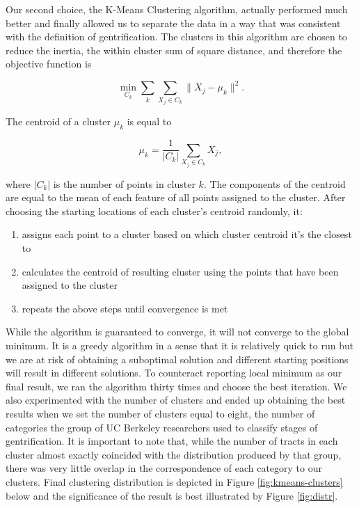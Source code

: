 \documentclass[a4paper, 12pt]{article}
\numberwithin{equation}{section}
\begin{document}
	        Our second choice, the K-Means Clustering algorithm, actually performed much better and finally allowed us to separate the data in a way that was consistent with the definition of gentrification. The clusters in this algorithm are chosen to reduce the inertia, the within cluster sum of square distance, and therefore the objective function is

            $$ \min_{C_k} \sum_{k} \sum_{X_j \in  C_k} \| X_j  - \mu_k \|^2. $$

            The centroid of a cluster $\mu_k$ is equal to

            $$ \mu_k = \frac{1}{|C_k|} \sum_{X_j \in C_k} X_j, $$

            where $|C_k|$ is the number of points in cluster $k$. The components of the centroid are equal to the mean of each feature of all points assigned to the cluster. After choosing the starting locations of each cluster's centroid randomly, it:
                
                \begin{enumerate}
                    \item assigns each point to a cluster based on which cluster centroid it's the closest to
                    \item calculates the centroid of resulting cluster using the points that have been assigned to the cluster
                    \item repeats the above steps until convergence is met
                \end{enumerate}
            
            While the algorithm is guaranteed to converge, it will not converge to the global minimum. It is a greedy algorithm in a sense that it is relatively quick to run but we are at risk of obtaining a suboptimal solution and different starting positions will result in different solutions. To counteract reporting local minimum as our final result, we ran the algorithm thirty times and choose the best iteration. We also experimented with the number of clusters and ended up obtaining the best results when we set the number of clusters equal to eight, the number of categories the group of UC Berkeley researchers used to classify stages of gentrification. It is important to note that, while the number of tracts in each cluster almost exactly coincided with the distribution produced by that group, there was very little overlap in the correspondence of each category to our clusters. Final clustering distribution is depicted in Figure \ref{fig:kmeans-clusters} below and the significance of the result is best illustrated by Figure \ref{fig:distr}.
            
\end{document}
